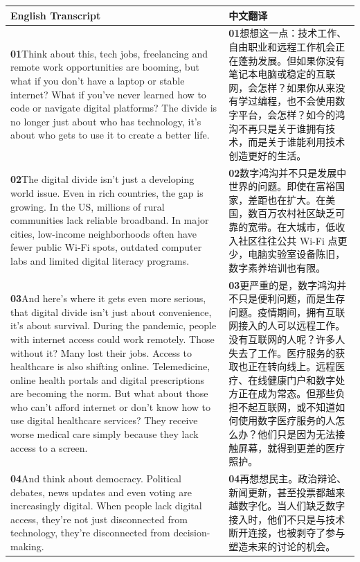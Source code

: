 \documentclass[UTF8,zihao=-4,fontset=fandol]{ctexart}
\newcommand{\TranscriptColumn}{\raggedright\arraybackslash\hyphenpenalty=10000\exhyphenpenalty=10000\sloppy}
\begin{document}
\renewcommand{\arraystretch}{1.23}
\begin{longtable}{>{\TranscriptColumn}p{} >{\TranscriptColumn}p{}}
\rowcolor{headerBg}\textbf{English Transcript} & \textbf{中文翻译} \\ \hline
\textbf{01}\quad Think about this, tech jobs, freelancing and remote work opportunities are booming, but what if you don't have a laptop or stable internet? What if you've never learned how to code or navigate digital platforms? The divide is no longer just about who has technology, it's about who gets to use it to create a better life. & \textbf{01}\quad 想想这一点：技术工作、自由职业和远程工作机会正在蓬勃发展。但如果你没有笔记本电脑或稳定的互联网，会怎样？如果你从来没有学过编程，也不会使用数字平台，会怎样？如今的鸿沟不再只是关于谁拥有技术，而是关于谁能利用技术创造更好的生活。 \\ \hline
\textbf{02}\quad The digital divide isn't just a developing world issue. Even in rich countries, the gap is growing. In the US, millions of rural communities lack reliable broadband. In major cities, low-income neighborhoods often have fewer public Wi-Fi spots, outdated computer labs and limited digital literacy programs. & \textbf{02}\quad 数字鸿沟并不只是发展中世界的问题。即使在富裕国家，差距也在扩大。在美国，数百万农村社区缺乏可靠的宽带。在大城市，低收入社区往往公共 Wi-Fi 点更少，电脑实验室设备陈旧，数字素养培训也有限。 \\ \hline
\textbf{03}\quad And here's where it gets even more serious, that digital divide isn't just about convenience, it's about survival. During the pandemic, people with internet access could work remotely. Those without it? Many lost their jobs. Access to healthcare is also shifting online. Telemedicine, online health portals and digital prescriptions are becoming the norm. But what about those who can't afford internet or don't know how to use digital healthcare services? They receive worse medical care simply because they lack access to a screen. & \textbf{03}\quad 更严重的是，数字鸿沟并不只是便利问题，而是生存问题。疫情期间，拥有互联网接入的人可以远程工作。没有互联网的人呢？许多人失去了工作。医疗服务的获取也正在转向线上。远程医疗、在线健康门户和数字处方正在成为常态。但那些负担不起互联网，或不知道如何使用数字医疗服务的人怎么办？他们只是因为无法接触屏幕，就得到更差的医疗照护。 \\ \hline
\textbf{04}\quad And think about democracy. Political debates, news updates and even voting are increasingly digital. When people lack digital access, they're not just disconnected from technology, they're disconnected from decision-making. & \textbf{04}\quad 再想想民主。政治辩论、新闻更新，甚至投票都越来越数字化。当人们缺乏数字接入时，他们不只是与技术断开连接，也被剥夺了参与塑造未来的讨论的机会。 \\ \hline
\end{longtable}
\end{document}
